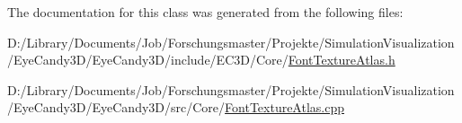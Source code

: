 The documentation for this class was generated from the following files\+:\begin{DoxyCompactItemize}
\item 
D\+:/\+Library/\+Documents/\+Job/\+Forschungsmaster/\+Projekte/\+Simulation\+Visualization/\+Eye\+Candy3\+D/\+Eye\+Candy3\+D/include/\+E\+C3\+D/\+Core/\mbox{\hyperlink{_font_texture_atlas_8h}{Font\+Texture\+Atlas.\+h}}\item 
D\+:/\+Library/\+Documents/\+Job/\+Forschungsmaster/\+Projekte/\+Simulation\+Visualization/\+Eye\+Candy3\+D/\+Eye\+Candy3\+D/src/\+Core/\mbox{\hyperlink{_font_texture_atlas_8cpp}{Font\+Texture\+Atlas.\+cpp}}\end{DoxyCompactItemize}
